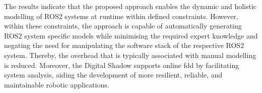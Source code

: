 The results indicate that the proposed approach enables the dynamic and holistic modelling of ROS2 systems at runtime within defined constraints. However, within these constraints, the approach is capable of automatically generating ROS2 system specific models while minimising the required expert knowledge and negating the need for manipulating the software stack of the respective ROS2 system. Thereby, the overhead that is typically associated with manual modelling is reduced. Moreover, the Digital Shadow supports online \acl{fdd} by facilitating system analysis, aiding the development of more resilient, reliable, and maintainable robotic applications.